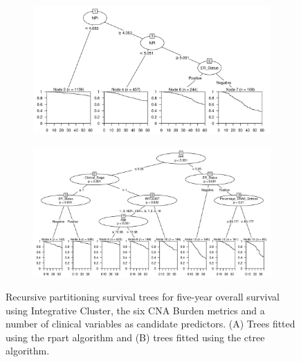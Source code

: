 \begin{figure}[!htb]
\centering

\vspace{1cm}

\begin{subfigure}{\textwidth}
\subcaption{}
\includegraphics[width=1\textwidth]{../figures/Appendices/Appendix_B/Clin_PartyKit_Survival_Burden_FiveYearOS_INTCLUST.png}
\end{subfigure}

\vspace{2cm}

\begin{subfigure}{\textwidth}
\subcaption{}
\includegraphics[width=1\textwidth]{../figures/Appendices/Appendix_B/Clin_Ctree_Survival_Burden_FiveYearOS_INTCLUST.png}
\end{subfigure}

\vspace{1cm}

\caption[Recursive partitioning survival trees for five-year overall survival using Integrative Cluster, the six CNA Burden metrics and a number of clinical variables as candidate predictors.]{Recursive partitioning survival trees for five-year overall survival using Integrative Cluster, the six CNA Burden metrics and a number of clinical variables as candidate predictors. (A) Trees fitted using the rpart algorithm and (B) trees fitted using the ctree algorithm.}
\end{figure}

